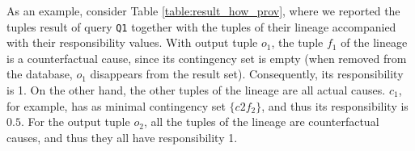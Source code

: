 As an example, consider Table \ref{table:result_how_prov}, where we reported the tuples result of query \texttt{Q1} together with the tuples of their lineage accompanied with their responsibility values. 
With output tuple $o_1$, the tuple $f_1$ of the lineage is a counterfactual cause, since its contingency set is empty (when removed from the database, $o_1$ disappears from the result set). Consequently, its responsibility is 1. On the other hand, the other tuples of the lineage are all actual causes. $c_1$, for example, has as minimal contingency set $\{c2f_2\}$, and thus its responsibility is $0.5$. 
For the output tuple $o_2$, all the tuples of the lineage are counterfactual causes, and thus they all have responsibility 1.








